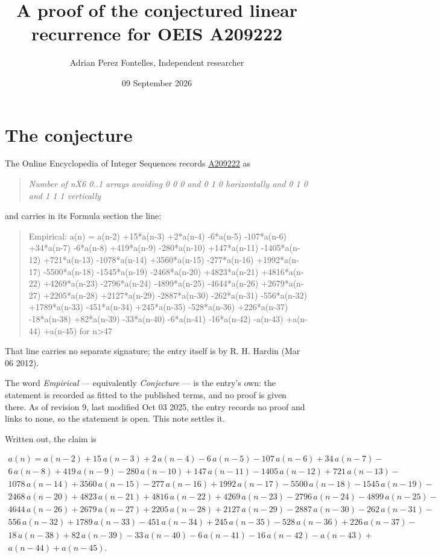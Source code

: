 \documentclass[11pt]{article}
\title{A proof of the conjectured linear recurrence for OEIS A209222}
\author{Adrian Perez Fontelles, Independent researcher}
\date{09 September 2026}
\theoremstyle{definition}
\begin{document}
\maketitle
\section{The conjecture}

The Online Encyclopedia of Integer Sequences records \href{https://oeis.org/A209222}{A209222} as

\begin{quote}\itshape Number of nX6 0..1 arrays avoiding 0 0 0 and 0 1 0 horizontally and 0 1 0 and 1 1 1 vertically\end{quote}

and carries in its Formula section the line:

\begin{quote}\ttfamily Empirical: a(n) = a(n-2) +15*a(n-3) +2*a(n-4) -6*a(n-5) -107*a(n-6) +34*a(n-7) -6*a(n-8) +419*a(n-9) -280*a(n-10) +147*a(n-11) -1405*a(n-12) +721*a(n-13) -1078*a(n-14) +3560*a(n-15) -277*a(n-16) +1992*a(n-17) -5500*a(n-18) -1545*a(n-19) -2468*a(n-20) +4823*a(n-21) +4816*a(n-22) +4269*a(n-23) -2796*a(n-24) -4899*a(n-25) -4644*a(n-26) +2679*a(n-27) +2205*a(n-28) +2127*a(n-29) -2887*a(n-30) -262*a(n-31) -556*a(n-32) +1789*a(n-33) -451*a(n-34) +245*a(n-35) -528*a(n-36) +226*a(n-37) -18*a(n-38) +82*a(n-39) -33*a(n-40) -6*a(n-41) -16*a(n-42) -a(n-43) +a(n-44) +a(n-45) for n>47\end{quote}

That line carries no separate signature; the entry itself is by R. H. Hardin (Mar 06 2012).

The word {\itshape Empirical} --- equivalently {\itshape Conjecture} --- is the entry's own: the statement is recorded as fitted to the published terms, and no proof is given there. As of revision 9, last modified Oct 03 2025, the entry records no proof and links to none, so the statement is open. This note settles it.

Written out, the claim is

\begin{multline*} a(n) = a(n-2) + 15\,a(n-3) + 2\,a(n-4) - 6\,a(n-5) - 107\,a(n-6) + 34\,a(n-7) - \\ 6\,a(n-8) + 419\,a(n-9) - 280\,a(n-10) + 147\,a(n-11) - 1405\,a(n-12) + 721\,a(n-13) - \\ 1078\,a(n-14) + 3560\,a(n-15) - 277\,a(n-16) + 1992\,a(n-17) - 5500\,a(n-18) - 1545\,a(n-19) - \\ 2468\,a(n-20) + 4823\,a(n-21) + 4816\,a(n-22) + 4269\,a(n-23) - 2796\,a(n-24) - 4899\,a(n-25) - \\ 4644\,a(n-26) + 2679\,a(n-27) + 2205\,a(n-28) + 2127\,a(n-29) - 2887\,a(n-30) - 262\,a(n-31) - \\ 556\,a(n-32) + 1789\,a(n-33) - 451\,a(n-34) + 245\,a(n-35) - 528\,a(n-36) + 226\,a(n-37) - \\ 18\,a(n-38) + 82\,a(n-39) - 33\,a(n-40) - 6\,a(n-41) - 16\,a(n-42) - a(n-43) + \\ a(n-44) + a(n-45). \end{multline*}
\end{document}

